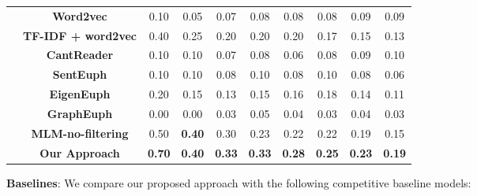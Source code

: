 \begin{table*}[ht!]
\begin{tabular}{c|c|cccccccc}
		\multirow{8}{*}{\rotatebox[origin=c]{90}{\textbf{Sexuality}}}
		&\textbf{Word2vec} & 0.10 & 0.05 & 0.07 & 0.08 & 0.08 & 0.08 & 0.09 &  0.09 \\
		&\textbf{TF-IDF + word2vec} & 0.40 & 0.25 & 0.20 & 0.20 & 0.20 & 0.17 & 0.15 & 0.13  \\
		&\textbf{CantReader \cite{yuan2018reading}} & 0.10 & 0.10 & 0.07 & 0.08 & 0.06 & 0.08 & 0.09 & 0.10 \\
		&\textbf{SentEuph \cite{felt2020recognizing}} & 0.10 & 0.10 & 0.08 & 0.10 & 0.08 & 0.10 & 0.08 & 0.06\\
		&\textbf{EigenEuph \cite{magu2018determining}} & 0.20 & 0.15 & 0.13 & 0.15 & 0.16 & 0.18 & 0.14 & 0.11\\
		&\textbf{GraphEuph \cite{taylor2017surfacing}} & 0.00 & 0.00 & 0.03 & 0.05 & 0.04 & 0.03 & 0.04 & 0.03 \\
		&\textbf{MLM-no-filtering} & 0.50 & \textbf{0.40} & 0.30 & 0.23 & 0.22 & 0.22 & 0.19 & 0.15 \\
		&\textbf{Our Approach} & \textbf{0.70} & \textbf{0.40}& \textbf{0.33}& \textbf{0.33}& \textbf{0.28}& \textbf{0.25}& \textbf{0.23}& \textbf{0.19} \\
		\bottomrule
	\end{tabular}
	\label{table:res_dec}
\end{table*}

\noindent \textbf{Baselines}: 
We compare our proposed approach with the following competitive baseline models:

